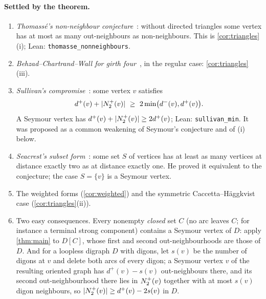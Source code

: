 \paragraph{Settled by the theorem.}
\begin{enumerate}[label=(\alph*),leftmargin=2em]
\item \emph{Thomass\'e's non-neighbour conjecture}~\cite[Conjecture~6.12]{Sullivan2006}:
without directed triangles some vertex has at most as many out-neighbours as
non-neighbours. This is \cref{cor:triangles}(i); Lean: \texttt{thomasse\_nonneighbours}.
\item \emph{Behzad--Chartrand--Wall for girth four}~\cite{BehzadChartrandWall1970}, in the
regular case: \cref{cor:triangles}(iii).
\item \emph{Sullivan's compromise}~\cite[Conjecture~6.7]{Sullivan2006}: some vertex $v$
satisfies
\[
 d^+(v)+\abs{\Ntwo(v)}\ \ge\ 2\min\bigl(d^-(v),d^+(v)\bigr).
\]
A Seymour vertex has $d^+(v)+\lvert N^+_2(v)\rvert\ge2d^+(v)$; Lean: \texttt{sullivan\_min}.
It was proposed as a common weakening of Seymour's conjecture and of (i) below.
\item \emph{Seacrest's subset form}~\cite{Seacrest2019}: some set $S$ of vertices has at
least as many vertices at distance exactly two as at distance exactly one. He proved it
equivalent to the conjecture; the case $S=\{v\}$ is a Seymour vertex.
\item The weighted forms (\cref{cor:weighted}) and the symmetric Caccetta--H\"aggkvist
case (\cref{cor:triangles}(ii)).
\item Two easy consequences. Every nonempty \emph{closed} set $C$ (no arc leaves $C$;
for instance a terminal strong component) contains a Seymour vertex of $D$: apply
\cref{thm:main} to $D[C]$, whose first and second out-neighbourhoods are those of $D$.
And for a loopless digraph $D$ with digons, let $s(v)$ be the number of digons at $v$
and delete both arcs of every digon; a Seymour vertex $v$ of the resulting oriented
graph has $d^+(v)-s(v)$ out-neighbours there, and its second out-neighbourhood there
lies in $N^+_2(v)$ together with at most $s(v)$ digon neighbours, so
$\lvert N^+_2(v)\rvert\ge d^+(v)-2s(v)$ in $D$.
\end{enumerate}

